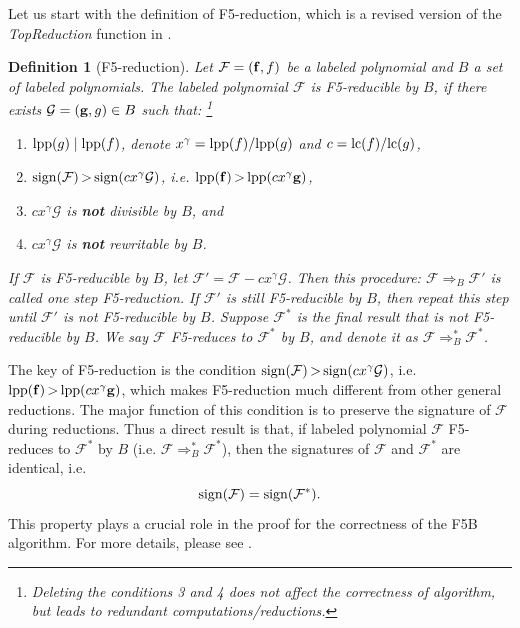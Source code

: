 \documentclass[preprint,authoryear,3p,12pt]{elsarticle}
\newtheorem{define}[theorem]{Definition}
\def\lpp{{\rm lpp}}
\def\lc{{\rm lc}}
\def\fb{{\bf f}}
\def\gb{{\bf g}}
\def\sus{{\,>\,}}
\def\s{{\rm{sign}}}
\def\p{{\rm{poly}}}
\begin{document}
Let us start with the definition of F5-reduction, which is a revised
version of the {\em TopReduction} function in \citep{Fau02}.

\begin{define}[F5-reduction] \label{df-reduce}
Let ${\mathcal F}=(\fb, f)  $ be a labeled polynomial and $B $ a set of labeled polynomials. The labeled polynomial ${\mathcal
F}$ is F5-reducible by $B$, if there exists ${\mathcal G}=(\gb, g)\in B$ such that: \footnote{Deleting the conditions 3 and 4
does not affect the correctness of algorithm, but leads to redundant computations/reductions.}
\begin{enumerate}

\item $\lpp(g) \mid \lpp(f)$, denote $x^\gamma=\lpp(f)/\lpp(g)$
and $c=\lc(f)/\lc(g)$,

\item $\s({\mathcal F})\sus \s(cx^\gamma{\mathcal G})$, i.e.
$\lpp(\fb) \sus \lpp(cx^{\gamma}\gb)$,

\item $cx^\gamma{\mathcal G}$ is {\bf not} divisible by $B$, and

\item $cx^\gamma{\mathcal G}$ is {\bf not} rewritable by $B$.
\end{enumerate}
If ${\mathcal F}$ is F5-reducible by $B$, let ${\mathcal
F}'={\mathcal F}-cx^\gamma{\mathcal G}$. Then this procedure:
${\mathcal F}\Longrightarrow_B {\mathcal F}'$ is called one step
F5-reduction. If ${\mathcal F}'$ is still F5-reducible by $B$, then
repeat this step until ${\mathcal F}'$ is not F5-reducible by $B$.
Suppose ${\mathcal F}^*$ is the final result that is not
F5-reducible by $B$. We say ${\mathcal F}$ F5-reduces to ${\mathcal
F}^*$ by $B$, and denote it as ${\mathcal F}\Longrightarrow_B^*
{\mathcal F}^*$.

\end{define}

The key of F5-reduction is the condition $\s({\mathcal F})\sus
\s(cx^\gamma{\mathcal G})$, i.e. $\lpp(\fb) \sus
\lpp(cx^{\gamma}\gb)$, which makes F5-reduction much different from
other general reductions. The major function of this condition is to
preserve the signature of ${\mathcal F}$ during reductions. Thus a
direct result is that, if labeled polynomial ${\mathcal F}$
F5-reduces to ${\mathcal F}^*$ by $B$ (i.e. ${\mathcal
F}\Longrightarrow_B^* {\mathcal F}^*$), then the signatures of
${\mathcal F}$ and ${\mathcal F}^*$ are identical, i.e.
$$\s({\mathcal F})=\s({\mathcal F}^*).$$ This property plays a
crucial role in the proof for the correctness of the F5B algorithm.
For more details, please see \citep{SunWang10}.
\end{document}
